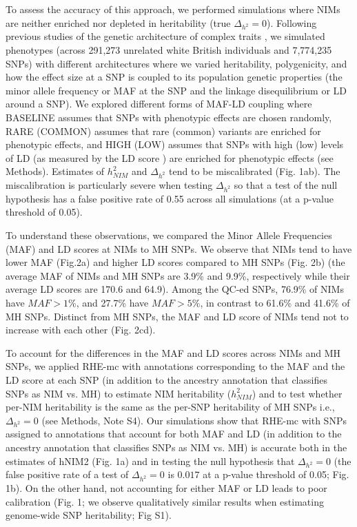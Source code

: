 To assess the accuracy of this approach, we performed simulations where NIMs are neither enriched nor depleted in heritability (true $\Delta_{h^2}=0$). Following previous studies of the genetic architecture of complex traits \cite{evans2018comparison}\cite{gazal}, we simulated phenotypes (across 291,273 unrelated white British individuals and 7,774,235 SNPs) with different architectures where we varied heritability, polygenicity, and how the effect size at a SNP is coupled to its population genetic properties (the minor allele frequency or MAF at the SNP and the linkage disequilibrium or LD around a SNP). We explored different forms of MAF-LD coupling where BASELINE assumes that SNPs with phenotypic effects are chosen randomly, RARE (COMMON) assumes that rare (common) variants are enriched for phenotypic effects, and HIGH (LOW) assumes that SNPs with high (low) levels of LD (as measured by the LD score \cite{finucane2015partitioning}) are enriched for phenotypic effects (see Methods). Estimates of $h^2_{NIM}$ and $\Delta_{h^2}$ tend to be miscalibrated (Fig. 1ab). The miscalibration is particularly severe when testing $\Delta_{h^2}$ so that a test of the null hypothesis has a false positive rate of 0.55 across all simulations (at a p-value threshold of 0.05).

To understand these observations, we compared the Minor Allele Frequencies (MAF) and LD scores at NIMs to MH SNPs. We observe that NIMs tend to have lower MAF (Fig.2a) and higher LD scores compared to MH SNPs (Fig. 2b) (the average MAF of NIMs and MH SNPs are 3.9\% and 9.9\%, respectively while their average LD scores are 170.6 and 64.9). Among the QC-ed SNPs, 76.9\% of NIMs have $MAF > 1\%$, and 27.7\% have $MAF > 5\%$, in contrast to 61.6\% and 41.6\% of MH SNPs. Distinct from MH SNPs, the MAF and LD score of NIMs tend not to increase with each other (Fig. 2cd). 

To account for the differences in the MAF and LD scores across NIMs and MH SNPs, we applied RHE-mc with annotations corresponding to the MAF and the LD score at each SNP (in addition to the ancestry annotation that classifies SNPs as NIM vs. MH) to estimate NIM heritability ($h^2_{NIM}$) and to test whether per-NIM heritability is the same as the per-SNP heritability of MH SNPs i.e., $\Delta_{h^2}=0$ (see Methods, Note S4). Our simulations show that RHE-mc with SNPs assigned to annotations that account for both MAF and LD (in addition to the ancestry annotation that classifies SNPs as NIM vs. MH) is accurate both in the estimates of hNIM2 (Fig. 1a) and in testing the null hypothesis that $\Delta_{h^2}=0$ (the false positive rate of a test of $\Delta_{h^2} = 0$  is $0.017$ at a p-value threshold of 0.05; Fig. 1b). On the other hand, not accounting for either MAF or LD leads to poor calibration (Fig. 1; we observe qualitatively similar results when estimating genome-wide SNP heritability; Fig S1).

